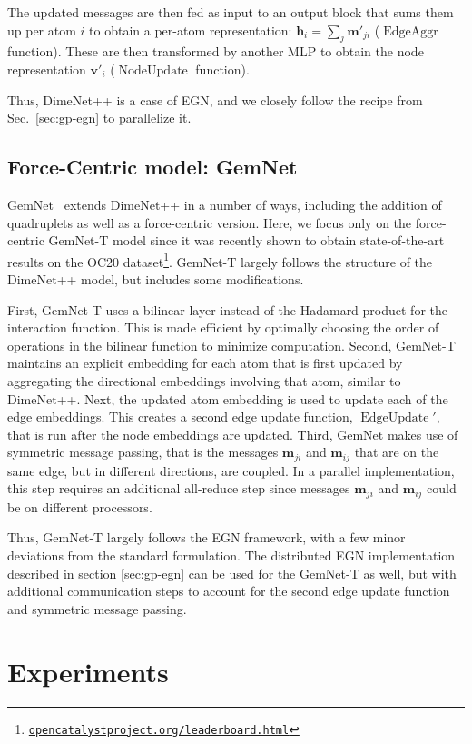 \documentclass{article} \usepackage{iclr2022_conference,times}
\def\vv{{\bm{v}}}
\newcommand{\hh}{\mathbf{h}}
\newcommand{\mm}{\mathbf{m}}
\DeclareMathOperator{\EU}{EdgeUpdate}
\DeclareMathOperator{\NU}{NodeUpdate}
\DeclareMathOperator{\EA}{EdgeAggr}
\begin{document}
The updated messages are then fed as input to an output block that sums them up per atom $i$ to obtain a per-atom representation: $\hh_i = \sum_j \mm'_{ji}$ ($\EA$ function). These are then transformed by another MLP to obtain the node representation $\vv'_i$ ($\NU$ function).

Thus, DimeNet++ is a case of EGN, and we closely follow the recipe from Sec.~\ref{sec:gp-egn} to parallelize it.

\subsection{Force-Centric model: GemNet}

GemNet~\citep{klicpera2021gemnet} extends DimeNet++ in a number of ways, including the addition of quadruplets as well as a force-centric version. Here, we focus only on the force-centric GemNet-T model since it was recently shown to obtain state-of-the-art results on the OC20 dataset\footnote{{\href{https://opencatalystproject.org/leaderboard.html}{\tt opencatalystproject.org/leaderboard.html}}}. GemNet-T largely follows the structure of the DimeNet++ model, but includes some modifications.

First, GemNet-T uses a bilinear layer instead of the Hadamard product for the interaction function. This is made efficient by optimally choosing the order of operations in the bilinear function to minimize computation. Second, GemNet-T maintains an explicit embedding for each atom that is first updated by aggregating the directional embeddings involving that atom, similar to DimeNet++. Next, the updated atom embedding is used to update each of the edge embeddings. This creates a second edge update function, $\EU'$, that is run after the node embeddings are updated. Third, GemNet makes use of symmetric message passing, that is the messages $\mm_{ji}$ and $\mm_{ij}$ that are on the same edge, but in different directions, are coupled.
In a parallel implementation, this step requires an additional all-reduce step since messages $\mm_{ji}$ and $\mm_{ij}$ could be on different processors.

Thus, GemNet-T largely follows the EGN framework, with a few minor deviations from the standard formulation. The distributed EGN implementation described in section \ref{sec:gp-egn} can be used for the GemNet-T as well, but with additional communication steps to account for the second edge update function and symmetric message passing.

\section{Experiments}
\end{document}
